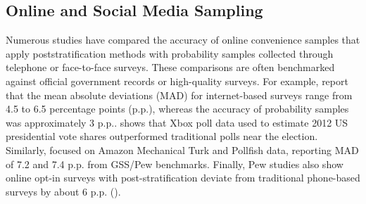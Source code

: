 \documentclass[letterpaper,12pt]{article}
\theoremstyle{proposition}
\begin{document}



\subsection*{Online and Social Media Sampling}

Numerous studies have compared the accuracy of online convenience samples that apply poststratification methods with probability samples collected through telephone or face-to-face surveys. These comparisons are often benchmarked against official government records or high-quality surveys. For example, \citet{yeager2011comparing} report that the mean absolute deviations (MAD) for internet-based surveys range from 4.5 to 6.5 percentage points (p.p.), whereas the accuracy of probability samples was approximately 3 p.p..  \citet{Wang2015} shows that Xbox poll data used to estimate 2012 US presidential vote shares outperformed traditional polls near the election. Similarly, \citet{goel2015non} focused on Amazon Mechanical Turk and Pollfish data, reporting MAD of 7.2 and 7.4 p.p. from GSS/Pew benchmarks. Finally, Pew studies also show online opt-in surveys with post-stratification deviate from traditional phone-based surveys by about 6 p.p. (\citealt{Mercer2018}).
\end{document}

